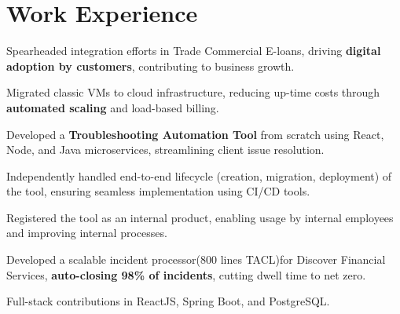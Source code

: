 \documentclass[]{dhirendra-pratap-singh-resume}
\begin{document}
\hfill
\begin{minipage}[t]{0.66\textwidth}


\section{Work Experience}
\vspace{\topsep}
\begin{tightemize}
\item Spearheaded integration efforts in Trade Commercial E-loans, driving \textbf{digital adoption by customers}, contributing to business growth.
\item Migrated classic VMs to cloud infrastructure, reducing up-time costs through \textbf{automated scaling} and load-based billing.
\item Developed a \textbf{Troubleshooting Automation Tool} from scratch using React, Node, and Java microservices, streamlining client issue resolution.
\item Independently handled end-to-end lifecycle (creation, migration, deployment) of the tool, ensuring seamless implementation using CI/CD tools.
\item Registered the tool as an internal product, enabling usage by internal employees and improving internal processes.
\end{tightemize}

\begin{tightemize}
\item Developed a scalable incident processor(800 lines TACL)for Discover Financial Services, \textbf{auto-closing 98\% of incidents}, cutting dwell time to net zero.
\item Full-stack contributions in ReactJS, Spring Boot, and PostgreSQL.
\end{tightemize}


\end{minipage}
\end{document}
